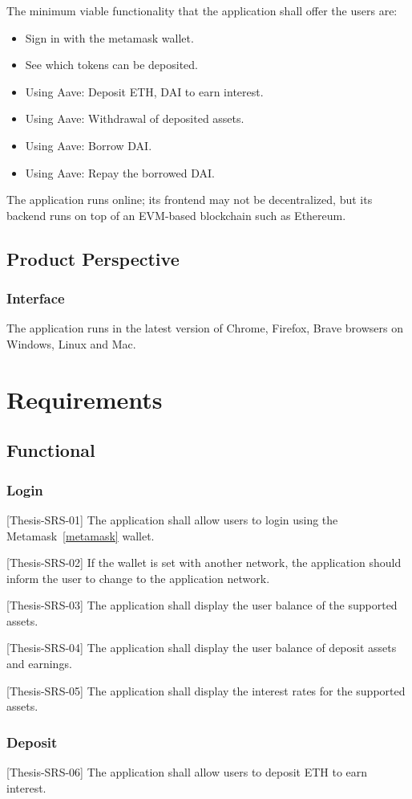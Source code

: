 \documentclass[11pt,a4paper]{report}
\begin{document}
The minimum viable functionality that the application shall offer the users are:
\begin{itemize}
	\item Sign in with the metamask wallet.
	\item See which tokens can be deposited.
	\item Using Aave: Deposit ETH, DAI to earn interest. 
	\item Using Aave: Withdrawal of deposited assets.
	\item Using Aave: Borrow DAI.
	\item Using Aave: Repay the borrowed DAI.
\end{itemize}
The application runs online; its frontend may not be decentralized, but its backend runs on top of an EVM-based blockchain such as Ethereum.
\subsection{Product Perspective}
\subsubsection{Interface}
The application runs in the latest version of Chrome, Firefox, Brave browsers on Windows, Linux and Mac.

\section{Requirements}
\subsection{Functional}
\subsubsection{Login}
[Thesis-SRS-01] The application shall allow users to login using the Metamask~\ref{metamask} wallet.

[Thesis-SRS-02]  If the wallet is set with another network, the application should inform the user to change to the application network.

[Thesis-SRS-03] The application shall display the user balance of the supported assets.

[Thesis-SRS-04] The application shall display the user balance of deposit assets and earnings.

[Thesis-SRS-05] The application shall display the interest rates for the supported assets.
\subsubsection{Deposit}
[Thesis-SRS-06] The application shall allow users to deposit ETH to earn interest.
\end{document}
